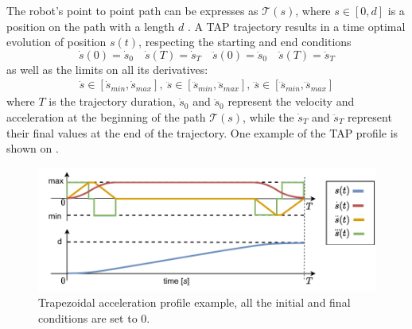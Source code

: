 The robot's point to point path can be expresses as $\mathcal{T}(s)$, where $s\in\left[0,d\right]$ is a position on the path with a length $d$ \cite{Constantinescu2000,Pfeiffer1987}. A TAP trajectory results in a time optimal evolution of position $s(t)$, respecting the starting and end conditions 
\begin{equation}
    \dot{s}(0) = \dot{s}_{0} \quad \dot{s}(T) = \dot{s}_{T} \quad
    \ddot{s}(0) = \ddot{s}_{0} \quad \ddot{s}(T) = \ddot{s}_{T}
\end{equation}
as well as the limits on all its derivatives:
\begin{equation}
\begin{split}
    \dot{s}\! \in\! [\dot{s}_{min}, \dot{s}_{max}], ~
\ddot{s}\!\in\! [\ddot{s}_{min}, \ddot{s}_{max}],~ 
\dddot{s}\!\in\! [\!\dddot{s\!}_{min}, \dddot{s\!}_{max}] 
\end{split}\label{eq:s_limits}
\end{equation}
where $T$ is the trajectory duration, $\dot{s}_{0}$ and $\ddot{s}_{0}$ represent the velocity and acceleration at the beginning of the path $\mathcal{T}(s)$, while the $\dot{s}_{T}$ and $\ddot{s}_{T}$ represent their final values at the end of the trajectory. One example of the TAP profile is shown on .


\begin{figure}
    \centering
    \includegraphics[width=\linewidth]{Papers/imgs/tap_profile.pdf}
    \caption{Trapezoidal acceleration profile example, all the initial and final conditions are set to 0.}
    \label{fig:tap_profile}
\end{figure}


